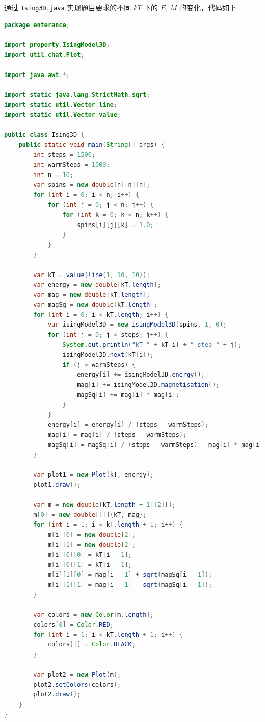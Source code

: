 \documentclass[UTF8]{ctexart}
\begin{document}
    通过 \texttt{Ising3D.java} 实现题目要求的不同 \(kT\) 下的 \(E, \, M\) 的变化，代码如下
    \begin{lstlisting}[language=Java, breaklines = true,label={lst:5.2}]
package enterance;

import property.IsingModel3D;
import util.chat.Plot;

import java.awt.*;

import static java.lang.StrictMath.sqrt;
import static util.Vector.line;
import static util.Vector.value;

public class Ising3D {
    public static void main(String[] args) {
        int steps = 1500;
        int warmSteps = 1000;
        int n = 10;
        var spins = new double[n][n][n];
        for (int i = 0; i < n; i++) {
            for (int j = 0; j < n; j++) {
                for (int k = 0; k < n; k++) {
                    spins[i][j][k] = 1.0;
                }
            }
        }

        var kT = value(line(1, 10, 10));
        var energy = new double[kT.length];
        var mag = new double[kT.length];
        var magSq = new double[kT.length];
        for (int i = 0; i < kT.length; i++) {
            var isingModel3D = new IsingModel3D(spins, 1, 0);
            for (int j = 0; j < steps; j++) {
                System.out.println("kT " + kT[i] + " step " + j);
                isingModel3D.next(kT[i]);
                if (j > warmSteps) {
                    energy[i] += isingModel3D.energy();
                    mag[i] += isingModel3D.magnetisation();
                    magSq[i] += mag[i] * mag[i];
                }
            }
            energy[i] = energy[i] / (steps - warmSteps);
            mag[i] = mag[i] / (steps - warmSteps);
            magSq[i] = magSq[i] / (steps - warmSteps) - mag[i] * mag[i];
        }

        var plot1 = new Plot(kT, energy);
        plot1.draw();

        var m = new double[kT.length + 1][2][];
        m[0] = new double[][]{kT, mag};
        for (int i = 1; i < kT.length + 1; i++) {
            m[i][0] = new double[2];
            m[i][1] = new double[2];
            m[i][0][0] = kT[i - 1];
            m[i][0][1] = kT[i - 1];
            m[i][1][0] = mag[i - 1] + sqrt(magSq[i - 1]);
            m[i][1][1] = mag[i - 1] - sqrt(magSq[i - 1]);
        }

        var colors = new Color[m.length];
        colors[0] = Color.RED;
        for (int i = 1; i < kT.length + 1; i++) {
            colors[i] = Color.BLACK;
        }

        var plot2 = new Plot(m);
        plot2.setColors(colors);
        plot2.draw();
    }
}
    \end{lstlisting}
\end{document}

